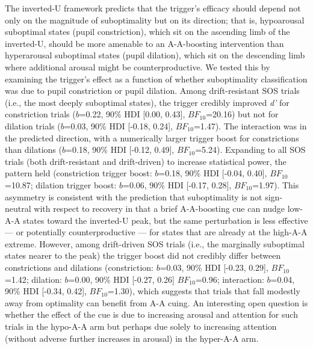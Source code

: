 The inverted-U framework predicts that the trigger's efficacy should depend not only on the magnitude of suboptimality but on its direction; that is, hypoarousal suboptimal states (pupil constriction), which sit on the ascending limb of the inverted-U, should be more amenable to an A-A-boosting intervention than hyperarousal suboptimal states (pupil dilation), which sit on the descending limb where additional arousal might be counterproductive. We tested this by examining the trigger's effect as a function of  whether suboptimality classification was due to pupil constriction or pupil dilation. Among drift-resistant SOS trials (i.e., the most deeply suboptimal states), the trigger credibly improved \textit{d'} for constriction trials ($b$=0.22, 90\% HDI [0.00, 0.43], $BF_{10}$=20.16) but not for dilation trials ($b$=0.03, 90\% HDI [-0.18, 0.24], $BF_{10}$=1.47). The interaction was in the predicted direction, with a numerically larger trigger boost for constrictions than dilations ($b$=0.18, 90\% HDI [-0.12, 0.49], $BF_{10}$=5.24). Expanding to all SOS trials (both drift-resistant and drift-driven) to increase statistical power, the pattern held (constriction trigger boost: $b$=0.18, 90\% HDI [-0.04, 0.40], $BF_{10}$=10.87; dilation trigger boost: $b$=0.06, 90\% HDI [-0.17, 0.28], $BF_{10}$=1.97). This asymmetry is consistent with the prediction that suboptimality is not sign-neutral with respect to recovery in that a brief A-A-boosting cue can nudge low-A-A states toward the inverted-U peak, but the same perturbation is less effective — or potentially counterproductive — for states that are already at the high-A-A extreme. However, among drift-driven SOS trials (i.e., the marginally suboptimal states nearer to the peak) the trigger boost did not credibly differ between constrictions and dilations (constriction: $b$=0.03, 90\% HDI [-0.23, 0.29], $BF_{10}$=1.42; dilation: $b$=0.00, 90\% HDI [-0.27, 0.26] $BF_{10}$=0.96; interaction: $b$=0.04, 90\% HDI [-0.34, 0.42], $BF_{10}$=1.30), which suggests that trials that fall modestly away from optimality can benefit from A-A cuing. An interesting open question is whether the effect of the cue is due to increasing arousal and attention for such trials in the hypo-A-A arm but perhaps due solely to increasing attention (without adverse further increases in arousal) in the hyper-A-A arm.

